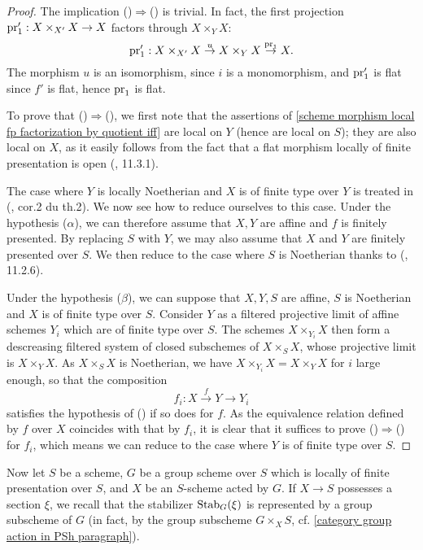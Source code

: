 \begin{proof}
The implication ()$\Rightarrow$() is trivial. In fact, the first projection $\mathrm{pr}_1':X\times_{X'}X\to X$ factors through $X\times_YX$:
\[\mathrm{pr}_1':X\times_{X'}X\stackrel{u}{\to} X\times_YX\stackrel{\mathrm{pr}_1}{\to} X.\]
The morphism $u$ is an isomorphism, since $i$ is a monomorphism, and $\mathrm{pr}_1'$ is flat since $f'$ is flat, hence $\mathrm{pr}_1$ is flat.\par
To prove that ()$\Rightarrow$(), we first note that the assertions of \cref{scheme morphism local fp factorization by quotient iff} are local on $Y$ (hence are local on $S$); they are also local on $X$, as it easily follows from the fact that a flat morphism locally of finite presentation is open (\cite{EGA4-3}, 11.3.1).\par
The case where $Y$ is locally Noetherian and $X$ is of finite type over $Y$ is treated in (\cite{Murre1964}, cor.2 du th.2). We now see how to reduce ourselves to this case. Under the hypothesis ($\alpha$), we can therefore assume that $X,Y$ are affine and $f$ is finitely presented. By replacing $S$ with $Y$, we may also assume that $X$ and $Y$ are finitely presented over $S$. We then reduce to the case where $S$ is Noetherian thanks to (\cite{EGA4-3}, 11.2.6).\par
Under the hypothesis ($\beta$), we can suppose that $X,Y,S$ are affine, $S$ is Noetherian and $X$ is of finite type over $S$. Consider $Y$ as a filtered projective limit of affine schemes $Y_i$ which are of finite type over $S$. The schemes $X\times_{Y_i}X$ then form a descreasing filtered system of closed subschemes of $X\times_SX$, whose projective limit is $X\times_YX$. As $X\times_SX$ is Noetherian, we have $X\times_{Y_i}X=X\times_YX$ for $i$ large enough, so that the composition
\[f_i:X\stackrel{f}{\to} Y\to Y_i\]
satisfies the hypothesis of () if so does for $f$. As the equivalence relation defined by $f$ over $X$ coincides with that by $f_i$, it is clear that it suffices to prove ()$\Rightarrow$() for $f_i$, which means we can reduce to the case where $Y$ is of finite type over $S$. 
\end{proof}

Now let $S$ be a scheme, $G$ be a group scheme over $S$ which is locally of finite presentation over $S$, and $X$ be an $S$-scheme acted by $G$. If $X\to S$ possesses a section $\xi$, we recall that the stabilizer $\mathrm{Stab}_G(\xi)$ is represented by a group subscheme of $G$ (in fact, by the group subscheme $G\times_XS$, cf. \ref{category group action in PSh paragraph}).

